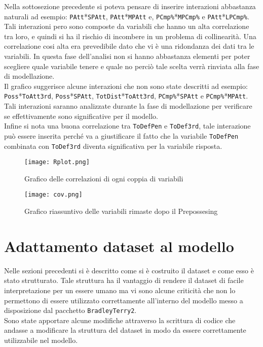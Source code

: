 Nella sottosezione precedente si poteva pensare di inserire interazioni abbastanza naturali ad esempio: \texttt{PAtt}*\texttt{SPAtt}, \texttt{PAtt}*\texttt{MPAtt} e, \texttt{PCmp\%}*\texttt{MPCmp\%} e \texttt{PAtt}*\texttt{LPCmp\%}. Tali interazioni pero sono composte da variabili che hanno un alta correlazione tra loro, e quindi si ha il rischio di incombere in un problema di collinearità. Una correlazione cosi alta era prevedibile dato che vi è una ridondanza dei dati tra le variabili. In questa fase dell'analisi non si hanno abbastanza elementi per poter scegliere quale variabile tenere e quale no perciò tale scelta verrà rinviata alla fase di modellazione.\\
Il grafico suggerisce alcune interazioni che non sono state descritti ad esempio:\\ \texttt{Poss}*\texttt{ToAtt3rd}, \texttt{Poss}*\texttt{SPAtt},  \texttt{TotDist}*\texttt{ToAtt3rd}, \texttt{PCmp\%}*\texttt{SPAtt} e \texttt{PCmp\%}*\texttt{MPAtt}.
Tali interazioni saranno analizzate durante la fase di modellazione per verificare se effettivamente sono significative per il modello.\\
Infine si nota una buona correlazione tra \texttt{ToDefPen} e \texttt{ToDef3rd}, tale interazione può essere inserita perché va a giustificare il fatto che la variabile \texttt{ToDefPen} combinata con \texttt{ToDef3rd} diventa significativa per la variabile risposta.

\begin{figure}[htbp]
	\begin{center}
		\texttt{[image: Rplot.png]}
		\caption{Grafico delle correlazioni di ogni coppia di variabili}  \label{fig:cor}
	\end{center}
\end{figure}

\begin{figure}[htbp]
	\begin{center}
		\texttt{[image: cov.png]}
		\caption{Grafico riassuntivo delle variabili rimaste dopo il Prepossesing}  \label{fig:cov}
	\end{center}
\end{figure}

\section{Adattamento dataset al modello}

Nelle sezioni precedenti si è descritto come si è costruito il dataset e come esso è stato strutturato. Tale struttura ha il vantaggio di rendere il dataset di facile interpretazione per un essere umano ma vi sono alcune criticità che non lo permettono di essere utilizzato correttamente all'interno del modello messo a disposizione dal pacchetto \texttt{BradleyTerry2}.\\ 
Sono state apportare alcune modifiche attraverso la scrittura di codice che andasse a modificare la struttura del dataset in modo da essere correttamente utilizzabile nel modello. \\

